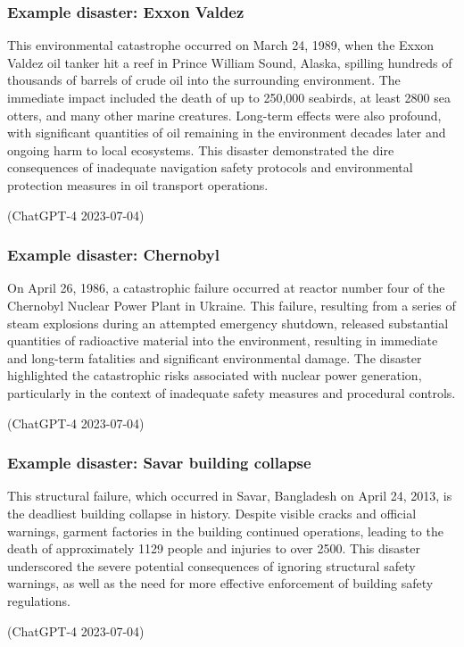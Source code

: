 \subsubsection{Example disaster: Exxon Valdez}
\begin{quoting}
    This environmental catastrophe occurred on March 24, 1989, when the Exxon Valdez oil tanker hit a reef in Prince William Sound, Alaska, spilling hundreds of thousands of barrels of crude oil into the surrounding environment. The immediate impact included the death of up to 250,000 seabirds, at least 2800 sea otters, and many other marine creatures. Long-term effects were also profound, with significant quantities of oil remaining in the environment decades later and ongoing harm to local ecosystems. This disaster demonstrated the dire consequences of inadequate navigation safety protocols and environmental protection measures in oil transport operations.

    (ChatGPT-4 2023-07-04)
\end{quoting}
\subsubsection{Example disaster: Chernobyl}
\begin{quoting}
    On April 26, 1986, a catastrophic failure occurred at reactor number four of the Chernobyl Nuclear Power Plant in Ukraine. This failure, resulting from a series of steam explosions during an attempted emergency shutdown, released substantial quantities of radioactive material into the environment, resulting in immediate and long-term fatalities and significant environmental damage. The disaster highlighted the catastrophic risks associated with nuclear power generation, particularly in the context of inadequate safety measures and procedural controls.

    (ChatGPT-4 2023-07-04)
\end{quoting}
\subsubsection{Example disaster: Savar building collapse}
\begin{quoting}
    This structural failure, which occurred in Savar, Bangladesh on April 24, 2013, is the deadliest building collapse in history. Despite visible cracks and official warnings, garment factories in the building continued operations, leading to the death of approximately 1129 people and injuries to over 2500. This disaster underscored the severe potential consequences of ignoring structural safety warnings, as well as the need for more effective enforcement of building safety regulations.

    (ChatGPT-4 2023-07-04)
\end{quoting}

